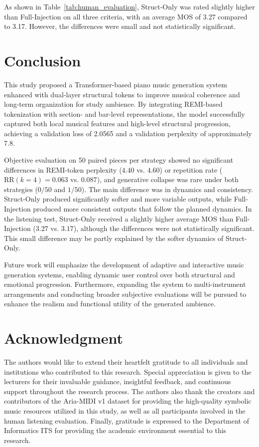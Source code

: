 \documentclass[conference,a4paper]{IEEEtran}
\begin{document}
As shown in Table~\ref{tab:human_evaluation}, Struct-Only was rated slightly higher than Full-Injection on all three criteria, with an average MOS of 3.27 compared to 3.17. However, the differences were small and not statistically significant.

\section{Conclusion}

This study proposed a Transformer-based piano music generation system enhanced with dual-layer structural tokens to improve musical coherence and long-term organization for study ambience. By integrating REMI-based tokenization with section- and bar-level representations, the model successfully captured both local musical features and high-level structural progression, achieving a validation loss of 2.0565 and a validation perplexity of approximately 7.8.

Objective evaluation on 50 paired pieces per strategy showed no significant differences in REMI-token perplexity ($4.40$ vs. $4.60$) or repetition rate ($\text{RR}(k=4) = 0.063$ vs. $0.087$), and generative collapse was rare under both strategies ($0/50$ and $1/50$). The main difference was in dynamics and consistency. Struct-Only produced significantly softer and more variable outputs, while Full-Injection produced more consistent outputs that follow the planned dynamics. In the listening test, Struct-Only received a slightly higher average MOS than Full-Injection ($3.27$ vs. $3.17$), although the differences were not statistically significant. This small difference may be partly explained by the softer dynamics of Struct-Only.

Future work will emphasize the development of adaptive and interactive music generation systems, enabling dynamic user control over both structural and emotional progression. Furthermore, expanding the system to multi-instrument arrangements and conducting broader subjective evaluations will be pursued to enhance the realism and functional utility of the generated ambience.

\section*{Acknowledgment}
The authors would like to extend their heartfelt gratitude to all individuals and institutions who contributed to this research. Special appreciation is given to the lecturers for their invaluable guidance, insightful feedback, and continuous support throughout the research process. The authors also thank the creators and contributors of the Aria-MIDI v1 dataset for providing the high-quality symbolic music resources utilized in this study, as well as all participants involved in the human listening evaluation. Finally, gratitude is expressed to the Department of Informatics ITS for providing the academic environment essential to this research.
\end{document}
